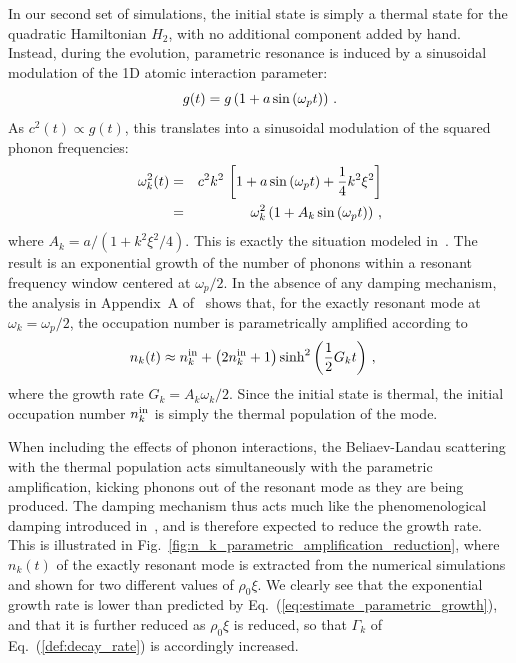 \documentclass[aps,prd,notitlepage,amsfonts,amssymb,amsmath,nofootinbib,superscriptaddress,longbibliography]{revtex4-2}
\begin{document}
In our second set of simulations, the initial state is simply a thermal state for the quadratic Hamiltonian $\hat{H}_{2}$, with no additional component added by hand.  Instead, during the evolution, parametric resonance is induced by a sinusoidal modulation of the 1D atomic interaction parameter:
\begin{equation}
\label{eq:def:modulation_g}
    g(t) = g \left(1 + a \, {\rm sin}\left(\omega_{p}t\right) \right) \,.
\end{equation}
As $c^{2}(t) \propto g(t)$, this translates into a sinusoidal modulation of the squared phonon frequencies:
\begin{eqnarray}
\label{eq:freq_modulation}
    \omega_{k}^{2}(t) &=& c^{2}k^{2} \, \left[ 1 + a\, {\rm sin}\left(\omega_{p}t\right) + \frac{1}{4} k^{2} \xi^{2} \right] \nonumber \\
    &=& \omega_{k}^{2} \left(1 + A_{k} \, {\rm sin}\left(\omega_{p}t\right) \right) \,,
\end{eqnarray}
where $A_{k} = a/\left(1+k^{2}\xi^{2}/4\right)$.
This is exactly the situation 
modeled in~\cite{Busch-2014}.  The result is an exponential growth of the number of phonons within a resonant frequency window centered at $\omega_{p}/2$.  
In the absence of any damping mechanism, the analysis in Appendix~A of~\cite{Busch-2014} shows that, for the exactly resonant mode at $\omega_{k} = \omega_{p}/2$, the occupation number is parametrically amplified according to 
\begin{align}
\begin{split}
\label{eq:estimate_parametric_growth}
n_{k}(t) & \approx n_{k}^{\rm in} + \left( 2 n^{\mathrm{in}}_{k} +1\right) \sinh^2 \left( \frac{1}{2} G_{k}  t  \right)  \,,
\end{split}
\end{align}
where the growth rate $G_{k} = A_{k} \omega_{k}/2$.
Since the initial state is thermal, the initial occupation number $n_{k}^{\rm in}$ is simply the thermal population of the mode.

When including the effects of phonon interactions, the Beliaev-Landau scattering with the thermal population acts simultaneously with the parametric amplification, kicking phonons out of the resonant mode as they are being produced. The damping mechanism thus acts much like the phenomenological damping introduced in~\cite{Busch-2014}, and is therefore expected to reduce the growth rate. This is illustrated in Fig.~\ref{fig:n_k_parametric_amplification_reduction}, where $n_{k}(t)$ of the exactly resonant mode is extracted from the numerical simulations and shown for two different values of $\rho_{0}\xi$.  We clearly see that the exponential growth rate is lower than predicted by Eq.~(\ref{eq:estimate_parametric_growth}), and that it is further reduced as $\rho_{0}\xi$ is reduced, so that $\Gamma_{k}$ of Eq.~(\ref{def:decay_rate}) is accordingly increased.
\end{document}
